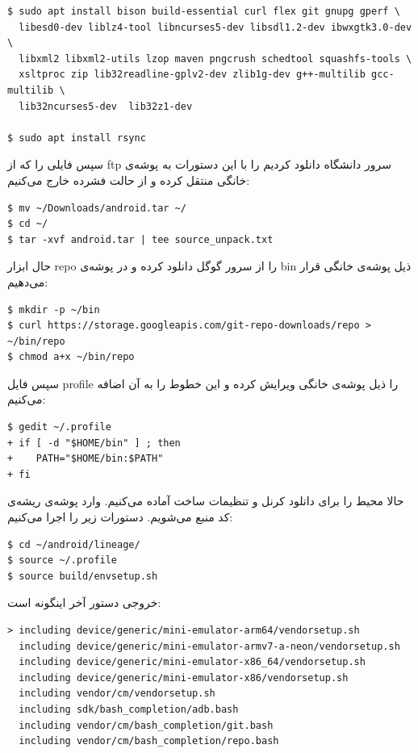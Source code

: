 \documentclass{article}
\begin{document}
\begin{latin}
\begin{verbatim}
$ sudo apt install bison build-essential curl flex git gnupg gperf \
  libesd0-dev liblz4-tool libncurses5-dev libsdl1.2-dev ibwxgtk3.0-dev \
  libxml2 libxml2-utils lzop maven pngcrush schedtool squashfs-tools \
  xsltproc zip lib32readline-gplv2-dev zlib1g-dev g++-multilib gcc-multilib \
  lib32ncurses5-dev  lib32z1-dev

$ sudo apt install rsync
\end{verbatim}	
\end{latin}
سپس فایلی را که از ftp سرور دانشگاه دانلود کردیم را با این دستورات به پوشه‌ی خانگی منتقل کرده و از حالت فشرده خارج می‌کنیم:
\begin{latin}
\begin{verbatim}
$ mv ~/Downloads/android.tar ~/
$ cd ~/
$ tar -xvf android.tar | tee source_unpack.txt
\end{verbatim}	
\end{latin}
حال ابزار repo را از سرور گوگل دانلود کرده و در پوشه‌ی bin ذیل پوشه‌ی خانگی قرار می‌دهیم:
\begin{latin}
\begin{verbatim}
$ mkdir -p ~/bin
$ curl https://storage.googleapis.com/git-repo-downloads/repo > ~/bin/repo
$ chmod a+x ~/bin/repo
\end{verbatim}	
\end{latin}

سپس فایل profile را ذیل پوشه‌ی خانگی ویرایش کرده و این خطوط را به آن اضافه می‌کنیم:

\begin{latin}
\begin{verbatim}
$ gedit ~/.profile
+ if [ -d "$HOME/bin" ] ; then
+    PATH="$HOME/bin:$PATH"
+ fi
\end{verbatim}	
\end{latin}

حالا محیط را برای دانلود کرنل و تنظیمات ساخت آماده می‌کنیم. وارد پوشه‌ی ریشه‌ی کد منبع می‌شویم. دستورات زیر را اجرا می‌کنیم:

\begin{latin}
\begin{verbatim}
$ cd ~/android/lineage/
$ source ~/.profile
$ source build/envsetup.sh
\end{verbatim}	
\end{latin}
خروجی دستور آخر اینگونه است:
\begin{latin}
\begin{verbatim}
> including device/generic/mini-emulator-arm64/vendorsetup.sh
  including device/generic/mini-emulator-armv7-a-neon/vendorsetup.sh
  including device/generic/mini-emulator-x86_64/vendorsetup.sh
  including device/generic/mini-emulator-x86/vendorsetup.sh
  including vendor/cm/vendorsetup.sh
  including sdk/bash_completion/adb.bash
  including vendor/cm/bash_completion/git.bash
  including vendor/cm/bash_completion/repo.bash
\end{verbatim}	
\end{latin}
\end{document}
